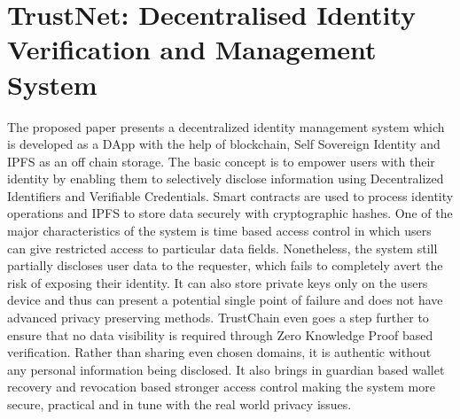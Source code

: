 \section{ TrustNet: Decentralised Identity Verification and Management System}
\endgroup
The proposed paper presents a decentralized identity management system which is developed as a DApp with the help of blockchain, Self Sovereign Identity and IPFS as an off chain storage. The basic concept is to empower users with their identity by enabling them to selectively disclose information using Decentralized Identifiers and Verifiable Credentials. Smart contracts are used to process identity operations and IPFS to store data securely with cryptographic hashes. One of the major characteristics of the system is time based access control in which users can give restricted access to particular data fields. Nonetheless, the system still partially discloses user data to the requester, which fails to completely avert the risk of exposing their identity. It can also store private keys only on the users device and thus can present a potential single point of failure and does not have advanced privacy preserving methods.
TrustChain even goes a step further to ensure that no data visibility is required through Zero Knowledge Proof based verification. Rather than sharing even chosen domains, it is authentic without any personal information being disclosed. It also brings in guardian based wallet recovery and revocation based stronger access control making the system more secure, practical and in tune with the real world privacy issues.\\

